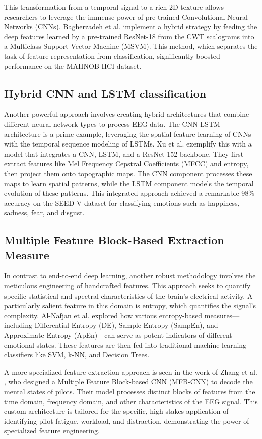 \documentclass[conference]{IEEEtran}
\begin{document}
This transformation from a temporal signal to a rich 2D texture allows researchers to leverage the immense power of pre-trained Convolutional Neural Networks (CNNs). Bagherzadeh et al. implement a hybrid strategy by feeding the deep features learned by a pre-trained ResNet-18 from the CWT scalograms into a Multiclass Support Vector Machine (MSVM). This method, which separates the task of feature representation from classification, significantly boosted performance on the MAHNOB-HCI dataset.

\subsection{Hybrid CNN and LSTM classification}
Another powerful approach involves creating hybrid architectures that combine different neural network types to process EEG data. The CNN-LSTM architecture is a prime example, leveraging the spatial feature learning of CNNs with the temporal sequence modeling of LSTMs. Xu et al. \cite{b2} exemplify this with a model that integrates a CNN, LSTM, and a ResNet-152 backbone. They first extract features like Mel Frequency Cepstral Coefficients (MFCC) and entropy, then project them onto topographic maps. The CNN component processes these maps to learn spatial patterns, while the LSTM component models the temporal evolution of these patterns. This integrated approach achieved a remarkable 98\% accuracy on the SEED-V dataset for classifying emotions such as happiness, sadness, fear, and disgust.

\subsection{Multiple Feature Block-Based Extraction Measure}
In contrast to end-to-end deep learning, another robust methodology involves the meticulous engineering of handcrafted features. This approach seeks to quantify specific statistical and spectral characteristics of the brain's electrical activity. A particularly salient feature in this domain is entropy, which quantifies the signal’s complexity. Al-Nafjan et al. \cite{b3} explored how various entropy-based measures—including Differential Entropy (DE), Sample Entropy (SampEn), and Approximate Entropy (ApEn)—can serve as potent indicators of different emotional states. These features are then fed into traditional machine learning classifiers like SVM, k-NN, and Decision Trees.

A more specialized feature extraction approach is seen in the work of Zhang et al. \cite{b4}, who designed a Multiple Feature Block-based CNN (MFB-CNN) to decode the mental states of pilots. Their model processes distinct blocks of features from the time domain, frequency domain, and other characteristics of the EEG signal. This custom architecture is tailored for the specific, high-stakes application of identifying pilot fatigue, workload, and distraction, demonstrating the power of specialized feature engineering.
\end{document}
